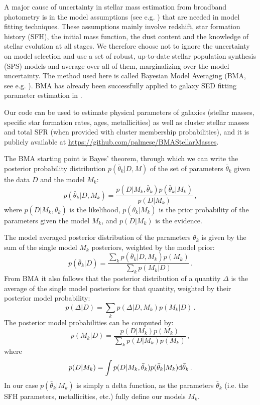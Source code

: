 A major cause of uncertainty in stellar mass estimation from broadband photometry is in the model assumptions (see e.g. \citealt{mitchell}) that are needed in model fitting techniques. These assumptions mainly involve redshift, star formation history (SFH), the initial mass function, the dust content and the knowledge of stellar evolution at all stages. 
We therefore choose not to ignore the uncertainty on model selection and use a set of robust, up-to-date stellar population synthesis (SPS) models and average over all of them, marginalizing over the model uncertainty. The method used here is called Bayesian Model Averaging (BMA, see e.g. \citealt{hoeting}). BMA has already been successfully applied to galaxy SED fitting  parameter estimation in \citet{taylor}.

Our code can be used to estimate physical parameters of galaxies (stellar masses, specific star formation rates, ages, metallicities) as well as cluster stellar masses and total SFR (when provided with cluster membership probabilities), and it is publicly available at \url{https://github.com/palmese/BMAStellarMasses}.

The BMA  starting point is Bayes' theorem, through which we can write the posterior probability distribution $p(\bar{\theta}_k|D,M)$ of the set of parameters $\bar{\theta}_k$ given the data $D$ and the model $M_k$:
\begin{equation}
p(\bar{\theta}_k|D,M_k)=\frac{p(D|M_k,\bar{\theta}_k)p(\bar{\theta}_k|M_k)}{p(D|M_k)}\,,
\end{equation}
where  $p(D|M_k,\bar{\theta}_k)$ is the likelihood, $p(\bar{\theta}_k|M_k)$ is the prior probability of the parameters given the model $M_k$, and  $p(D|M_k)$ is the evidence.

The model averaged posterior distribution of the parameters $\theta_k$ is given by the sum of the single model $M_k$ posteriors, weighted by the model prior:
\begin{equation}
p(\bar{\theta}_k|D)=\frac{\sum_kp(\bar{\theta}_k|D,M_k) p(M_k)}{\sum_k p(M_k|D)}\,.
\end{equation}
From BMA it also follows that the  posterior distribution of a  quantity $\Delta$ is the average of the single model posteriors  for that quantity,  weighted by their posterior model probability:
\begin{equation}
p(\Delta|D)=\sum_kp(\Delta|D,M_k) p(M_k|D)\,.\label{bmaeq}
\end{equation}
The posterior model probabilities can be computed by:
\begin{equation}
p(M_k|D)=\frac{p(D|M_k) p(M_k)}{\sum_k p(D|M_k) p(M_k)}\,,
\end{equation}
where
\begin{equation}
p(D|M_k)=\int p(D|M_k,\bar{\theta}_k)p(\bar{\theta}_k|M_k){\rm d}\bar{\theta}_k\,.\label{bmaeq}
\end{equation}
In our case $p(\bar{\theta}_k|M_k)$ is simply a delta function, as the parameters  $\bar{\theta}_k$ (i.e. the SFH parameters, metallicities, etc.) fully  define our models $M_k$.

